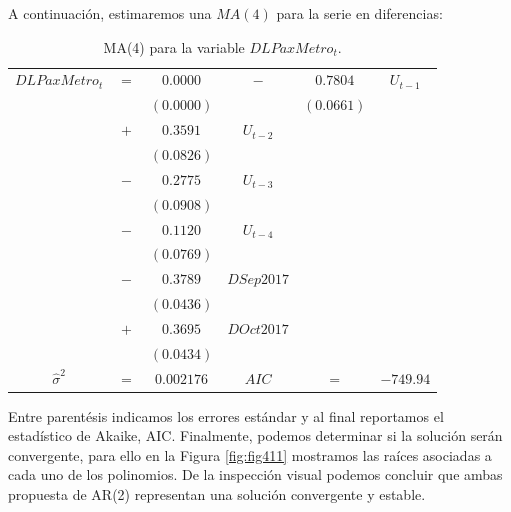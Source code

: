 \documentclass[
]{book}
\begin{document}
A continuación, estimaremos una \(MA(4)\) para la serie en diferencias:

\begin{longtable}[]{@{}cccccc@{}}
\caption{\label{tab:MA04} MA(4) para la variable \(DLPaxMetro_t\).}\tabularnewline
\toprule\noalign{}
\endfirsthead
\endhead
\bottomrule\noalign{}
\endlastfoot
\(DLPaxMetro_t\) & \(=\) & \(0.0000\) & \(-\) & \(0.7804\) & \(U_{t-1}\) \\
& & \((0.0000)\) & & \((0.0661)\) & \\
& \(+\) & \(0.3591\) & \(U_{t-2}\) & & \\
& & \((0.0826)\) & & & \\
& \(-\) & \(0.2775\) & \(U_{t-3}\) & & \\
& & \((0.0908)\) & & & \\
& \(-\) & \(0.1120\) & \(U_{t-4}\) & & \\
& & \((0.0769)\) & & & \\
& \(-\) & \(0.3789\) & \(DSep2017\) & & \\
& & \((0.0436)\) & & & \\
& \(+\) & \(0.3695\) & \(DOct2017\) & & \\
& & \((0.0434)\) & & & \\
\(\hat{\sigma}^2\) & \(=\) & \(0.002176\) & \(AIC\) & \(=\) & \(-749.94\) \\
\end{longtable}

Entre parentésis indicamos los errores estándar y al final reportamos el estadístico de Akaike, AIC. Finalmente, podemos determinar si la solución serán convergente, para ello en la Figura \ref{fig:fig411} mostramos las raíces asociadas a cada uno de los polinomios. De la inspección visual podemos concluir que ambas propuesta de AR(2) representan una solución convergente y estable.
\end{document}
